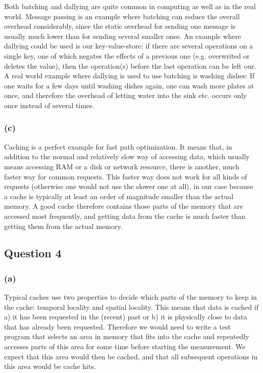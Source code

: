 \documentclass[12pt,a4paper]{article}
\begin{document}
Both batching and dallying are quite common in computing as well as in the real world. Message passing is an example where batching can reduce the overall overhead considerably, since the static overhead for sending one message is usually much lower than for sending several smaller ones. An example where dallying could be used is our key-value-store: if there are several operations on a single key, one of which negates the effects of a previous one (e.g. overwrited or deletes the value), then the operation(s) before the last operation can be left our. A real world example where dallying is used to use batching is washing dishes: If one waits for a few days until washing dishes again, one can wash more plates at once, and therefore the overhead of letting water into the sink etc. occurs only once instead of several times.

\subsubsection*{(c)}
Caching is a perfect example for fast path optimization. It means that, in addition to the normal and relatively slow way of accessing data, which usually means accessing RAM or a disk or network resource, there is another, much faster way for common requests. This faster way does not work for all kinds of requests (otherwise one would not use the slower one at all), in our case because a cache is typically at least an order of magnitude smaller than the actual memory. A good cache therefore contains those parts of the memory that are accessed most frequently, and getting data from the cache is much faster than getting them from the actual memory. 

\subsection*{Question 4}
\label{sec:eq4}

\subsubsection*{(a)}
Typical caches use two properties to decide which parts of the memory to keep in the cache: temporal locality and spatial locality. This means that data is cached if a) it has been requested in the (recent) past or b) it is physically close to data that has already been requested. Therefore we would need to write a test program that selects an area in memory that fits into the cache and repeatedly accesses parts of this area for some time before starting the measurement. We expect that this area would then be cached, and that all subsequent operations in this area would be cache hits.
\end{document}
